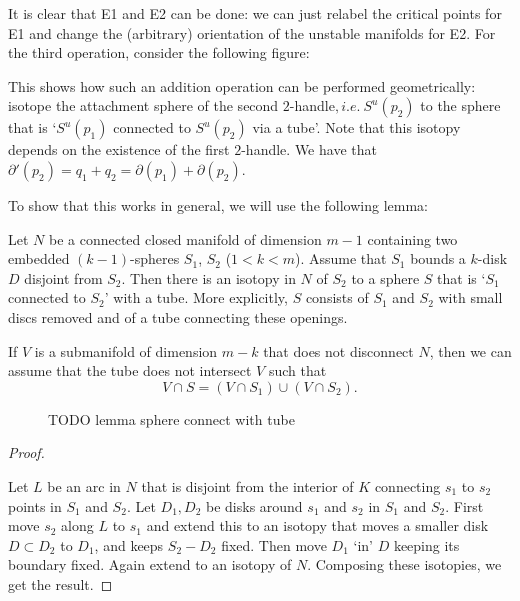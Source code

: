 It is clear that E1 and E2 can be done: we can just relabel the critical points for E1 and change the (arbitrary) orientation of the unstable manifolds for E2.
For the third operation, consider the following figure:

\begin{figure}[H]
    \centering
\end{figure}
This shows how such an addition operation can be performed geometrically: isotope the attachment sphere of the second $2$-handle$, i.e.\ S^{u}(p_2)$ to the sphere that is `$S^{u}(p_1)$ connected to $S^{u}(p_2)$ via a tube'. Note that this isotopy depends on the existence of the first $2$-handle.
We have that $\partial'(p_2) = q_1 + q_2 = \partial(p_1) + \partial(p_2)$.

To show that this works in general, we will use the following lemma:
\begin{lemma}
    Let $N$ be a connected closed manifold of dimension $m-1$ containing two embedded $(k-1)$-spheres $ S_1$, $S_2$ ($1 < k < m$).
    Assume that $S_1$ bounds a $k$-disk $D$  disjoint from $ S_2$. Then there is an isotopy in $N$ of  $ S_2$ to a sphere $S$ that is `$S_1$ connected to $ S_2$' with a tube.
    More explicitly, $S$ consists of $S_1$ and $ S_2$ with small discs removed and of a tube connecting these openings.

    If $V$ is a submanifold of dimension $m-k$ that does not disconnect $N$,  then we can assume that the tube does not intersect $V$ such that
     \[
         V \cap S = (V \cap S_1) \cup (V \cap S_2)
    .\] 
\end{lemma}
\begin{figure}[H]
    \centering
    \caption{TODO lemma sphere connect with tube}
    \label{fig:lemma-sphere-connect-with-tube}
\end{figure}
\begin{proof}
    \begin{marginfigure}
        \centering
        \caption{TODO lemma sphere connect with tube proof}
        \label{fig:lemma-sphere-connect-with-tube-proof}
    \end{marginfigure}
    Let $L$ be an arc in $N$ that is disjoint from  the interior of $K$ connecting  $s_1$ to $s_2$ points in $S_1$ and $S_2$.
    Let $D_1, D_2$ be disks around $s_1$ and $ s_2$ in $ S_1$ and $S_2$.
    First move $s_2$ along $L$ to  $ s_1$ and extend this to an isotopy that moves a smaller disk $D \subset D_2$ to $D_1$, and keeps $ S_2 - D_2$ fixed.
    Then move $D_1$ `in' $D$ keeping its boundary fixed. Again extend to an isotopy of $N$.
    Composing these isotopies, we get the result.
\end{proof}

